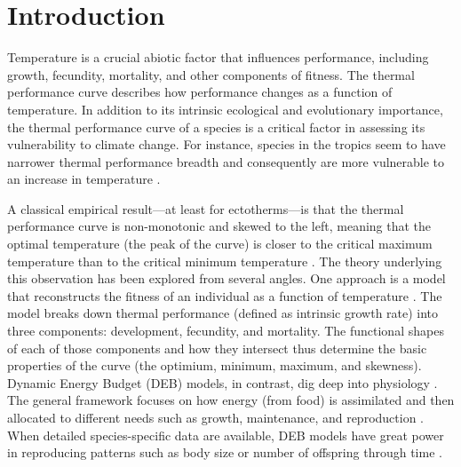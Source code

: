 \section*{Introduction}

Temperature is a crucial abiotic factor that influences performance, including growth, fecundity, mortality, and other components of fitness. %
The thermal performance curve describes how performance changes as a function of temperature. %
In addition to its intrinsic ecological and evolutionary importance, the thermal performance curve of a species is a critical factor in assessing its vulnerability to climate change. %
For instance, species in the tropics seem to have narrower thermal performance breadth and consequently are more vulnerable to an increase in temperature \citep{Deutsch2008}.

A classical empirical result---at least for ectotherms---is that the thermal performance curve is non-monotonic and skewed to the left, meaning that the optimal temperature (the peak of the curve) is closer to the critical maximum temperature than to the critical minimum temperature \citep[e.g.,][]{Angilletta2009}. %
The theory underlying this observation has been explored from several angles.  %
One approach is a model that reconstructs the fitness of an individual as a function of temperature \citep{Amarasekare2012}.
The model breaks down thermal performance (defined as intrinsic growth rate) into three components: development, fecundity, and mortality. %
The functional shapes of each of those components and how they intersect thus determine the basic properties of the curve (the optimium, minimum, maximum, and skewness).
Dynamic Energy Budget (DEB) models, in contrast, dig deep into physiology \citep{Kooijman2009}.
The general framework focuses on how energy (from food) is assimilated and then allocated to different needs such as growth, maintenance, and reproduction \citep{Kooijman2009}. %
When detailed species-specific data are available, DEB models have great power in reproducing patterns such as body size or number of offspring through time \citep{Nisbet2000}. %

